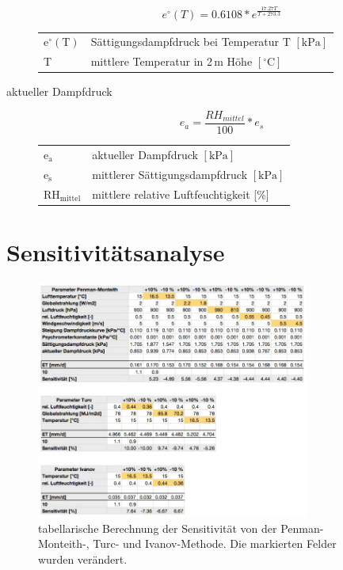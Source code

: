 \begin{appendix}
\begin{description}
\begin{equation}
\label{eq:enull}
e^{\circ}(T)=0.6108*e^{\frac{17.27T}{T+273.3}}
\end{equation}
\begin{table}[H]
\centering
\begin{tabular}{ll}
$\mathrm{e^{\circ}(T)}$ & Sättigungsdampfdruck bei Temperatur T $\mathrm{[kPa]}$\\
T & mittlere Temperatur in 2\,m Höhe $\mathrm{[^{\circ}C]}$\\\end{tabular}
\end{table}


\item[aktueller Dampfdruck]
\begin{equation}
\label{eq:ea}
e_a=\frac{RH_{mittel}}{100}*e_s
\end{equation}
\begin{table}[H]
\centering
\begin{tabular}{ll}
$\mathrm{e_a}$ & aktueller Dampfdruck $\mathrm{[kPa]}$\\
$\mathrm{e_s}$ & mittlerer Sättigungsdampfdruck $\mathrm{[kPa]}$\\
$\mathrm{RH_{mittel}}$ & mittlere relative Luftfeuchtigkeit [\%]\\
\end{tabular}
\end{table}

\end{description}


\section{Sensitivitätsanalyse}
\label{sec:sensitivitaet}

\begin{figure}[H]
\centering
\includegraphics[width=0.8\textwidth]{figures/sensitivitaet.jpg}
\caption{tabellarische Berechnung der Sensitivität von der Penman-Monteith-, Turc- und Ivanov-Methode. Die markierten Felder wurden  verändert.}
\label{fig:lysimeter_ART}
\end{figure}

\end{appendix}